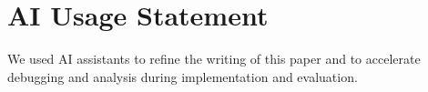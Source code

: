 
\section{AI Usage Statement}
\label{sec:ai-usage}

We used AI assistants to refine the writing of this paper and to accelerate debugging and analysis during implementation and evaluation.
